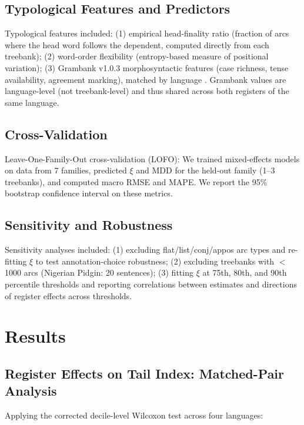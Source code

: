 \documentclass[11pt,letterpaper]{article}
\begin{document}
\subsection{Typological Features and Predictors}

Typological features included: (1) empirical head-finality ratio (fraction of arcs where the head word follows the dependent, computed directly from each treebank); (2) word-order flexibility (entropy-based measure of positional variation); (3) Grambank v1.0.3 morphosyntactic features (case richness, tense availability, agreement marking), matched by language \citep{Dryer2013}. Grambank values are language-level (not treebank-level) and thus shared across both registers of the same language.

\subsection{Cross-Validation}

Leave-One-Family-Out cross-validation (LOFO): We trained mixed-effects models on data from 7 families, predicted $\xi$ and MDD for the held-out family (1--3 treebanks), and computed macro RMSE and MAPE. We report the 95\% bootstrap confidence interval on these metrics.

\subsection{Sensitivity and Robustness}

Sensitivity analyses included: (1) excluding flat/list/conj/appos arc types and re-fitting $\xi$ to test annotation-choice robustness; (2) excluding treebanks with $<$1000 arcs (Nigerian Pidgin: 20 sentences); (3) fitting $\xi$ at 75th, 80th, and 90th percentile thresholds and reporting correlations between estimates and directions of register effects across thresholds.

\section{Results}

\subsection{Register Effects on Tail Index: Matched-Pair Analysis}

Applying the corrected decile-level Wilcoxon test across four languages:
\end{document}
